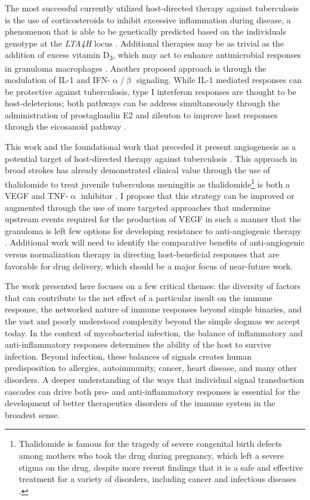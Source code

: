 The most successful currently utilized host\hyp{}directed therapy against tuberculosis is the use of corticosteroids to inhibit excessive inflammation during disease, a phenomenon that is able to be genetically predicted based on the individuals genotype at the \textit{LTA4H} locus \citep{Tobin2012, Tobin2015}. Additional therapies may be as trivial as the addition of excess vitamin D\textsubscript{3}, which may act to enhance antimicrobial responses in granuloma macrophages \citep{Tobin2015}. Another proposed approach is through the modulation of IL\hyp{}1 and IFN\hyp{}$\upalpha$/$\upbeta$ signaling. While IL\hyp{}1 mediated responses can be protective against tuberculosis, type I interferon responses are thought to be host\hyp{}deleterious; both pathways can be address simultaneously through the administration of prostaglandin E2 and zileuton to improve host responses through the eicosanoid pathway \citep{MayerBarber2014, Kaufmann2014}.

This work and the foundational work that preceded it present angiogenesis as a potential target of host\hyp{}directed therapy against tuberculosis \citep{Oehlers2015, Datta2015, Oehlers2017, Polena2016, Walton2018}. This approach in broad strokes has already demonstrated clinical value through the use of thalidomide to treat juvenile tuberculous meningitis as thalidomide\footnote{Thalidomide is famous for the tragedy of severe congenital birth defects among mothers who took the drug during pregnancy, which left a severe stigma on the drug, despite more recent findings that it is a safe and effective treatment for a variety of disorders, including cancer and infectious diseases \citep{McBride1961, DAmato1994, Franks2004}.} is both a VEGF and TNF\hyp{}$\upalpha$ inhibitor \citep{Kaufmann2014, vanToorn2021}. I propose that this strategy can be improved or augmented through the use of more targeted approaches that undermine upstream events required for the production of VEGF in such a manner that the granuloma is left few options for developing resistance to anti\hyp{}angiogenic therapy \citep{Kiran2016}. Additional work will need to identify the comparative benefits of anti\hyp{}angiogenic versus normalization therapy in directing host\hyp{}beneficial responses that are favorable for drug delivery, which should be a major focus of near\hyp{}future work.

The work presented here focuses on a few critical themes: the diversity of factors that can contribute to the net effect of a particular insult on the immune response, the networked nature of immune responses beyond simple binaries, and the vast and poorly understood complexity beyond the simple dogmas we accept today. In the context of mycobacterial infection, the balance of inflammatory and anti\hyp{}inflammatory responses determines the ability of the host to survive infection. Beyond infection, these balances of signals creates human predisposition to allergies, autoimmunity, cancer, heart disease, and many other disorders. A deeper understanding of the ways that individual signal transduction cascades can drive both pro\hyp{} and anti\hyp{}inflammatory responses is essential for the development of better therapeutics disorders of the immune system in the broadest sense.

